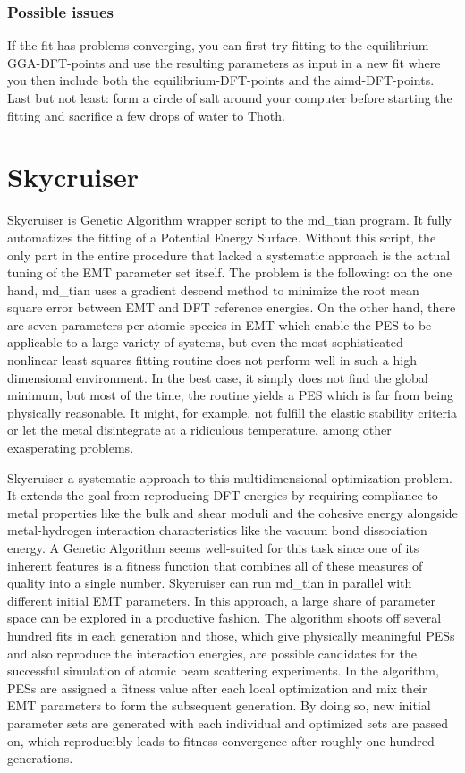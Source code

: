 \documentclass[twoside, 11pt, titlepage, captions=nooneline, a4paper, headsepline]{scrbook}%
\newcommand{\9}{\mathrm}
\newcommand{\0}{\,\mathrm}
\begin{document}
\subsection{Possible issues}
If the fit has problems converging, you can first try fitting to the equilibrium-GGA-DFT-points and use the resulting parameters as input in a new fit where you then include both the equilibrium-DFT-points and the aimd-DFT-points.
Last but not least: form a circle of salt around your computer before starting the fitting and sacrifice a few drops of water to Thoth.\\



\chapter{Skycruiser}
Skycruiser is Genetic Algorithm wrapper script to the md\_tian program. It fully automatizes the fitting of a Potential Energy Surface. Without this script, the only part in the entire procedure that lacked a systematic approach is the actual tuning of the EMT parameter set itself. The problem is the following: on the one hand, md\_tian uses a gradient descend method to minimize the root mean square error between EMT and DFT reference energies. On the other hand, there are seven parameters per atomic species in EMT which enable the PES to be applicable to a large variety of systems, but even the most sophisticated nonlinear least squares fitting routine does not perform well in such a high dimensional environment. In the best case, it simply does not find the global minimum, but most of the time, the routine yields a PES which is far from being physically reasonable. It might, for example, not fulfill the elastic stability criteria or let the metal disintegrate at a ridiculous temperature, among other exasperating problems.

Skycruiser a systematic approach to this multidimensional optimization problem. It extends the goal from reproducing DFT energies by requiring compliance to metal properties like the bulk and shear moduli and the cohesive energy alongside metal-hydrogen interaction characteristics like the vacuum bond dissociation energy. A Genetic Algorithm seems well-suited for this task since one of its inherent features is a fitness function that combines all of these measures of quality into a single number. Skycruiser can run md\_tian in parallel with different initial EMT parameters. In this approach, a large share of parameter space can be explored in a productive fashion. The algorithm shoots off several hundred fits in each generation and those, which give physically meaningful PESs and also reproduce the interaction energies, are possible candidates for the successful simulation of atomic beam scattering experiments. In the algorithm, PESs are assigned a fitness value after each local optimization and mix their EMT parameters to form the subsequent generation. By doing so, new initial parameter sets are generated with each individual and optimized sets are passed on, which reproducibly leads to fitness convergence after roughly one hundred generations.
\end{document}
